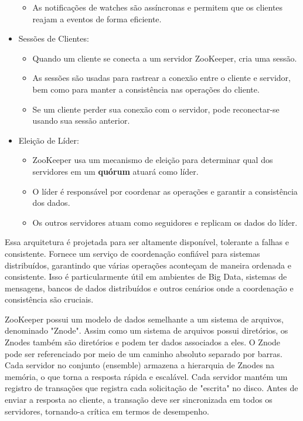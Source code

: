 \documentclass[a4paper,11pt]{article}
\begin{document}
\begin{itemize}
\begin{itemize}
        \item As notificações de watches são assíncronas e permitem que os clientes reajam a eventos de forma eficiente.
	\end{itemize}
    \item Sessões de Clientes:
	\begin{itemize}
		\item Quando um cliente se conecta a um servidor ZooKeeper, cria uma sessão.
        \item As sessões são usadas para rastrear a conexão entre o cliente e servidor, bem como para manter a consistência nas operações do cliente.
        \item Se um cliente perder sua conexão com o servidor, pode reconectar-se usando sua sessão anterior.
	\end{itemize}
    \item Eleição de Líder:
	\begin{itemize}
		\item ZooKeeper usa um mecanismo de eleição para determinar qual dos servidores em um \textbf{quórum} atuará como líder.
        \item O líder é responsável por coordenar as operações e garantir a consistência dos dados.
        \item Os outros servidores atuam como seguidores e replicam os dados do líder.
	\end{itemize}
\end{itemize}

Essa arquitetura é projetada para ser altamente disponível, tolerante a falhas e consistente. Fornece um serviço de coordenação confiável para sistemas distribuídos, garantindo que várias operações aconteçam de maneira ordenada e consistente. Isso é particularmente útil em ambientes de Big Data, sistemas de mensagens, bancos de dados distribuídos e outros cenários onde a coordenação e consistência são cruciais.

ZooKeeper possui um modelo de dados semelhante a um sistema de arquivos, denominado "Znode". Assim como um sistema de arquivos possui diretórios, os Znodes também são diretórios e podem ter dados associados a eles. O Znode pode ser referenciado por meio de um caminho absoluto separado por barras. Cada servidor no conjunto (ensemble) armazena a hierarquia de Znodes na memória, o que torna a resposta rápida e escalável. Cada servidor mantém um registro de transações que registra cada solicitação de "escrita" no disco. Antes de enviar a resposta ao cliente, a transação deve ser sincronizada em todos os servidores, tornando-a crítica em termos de desempenho. 
\end{document}
